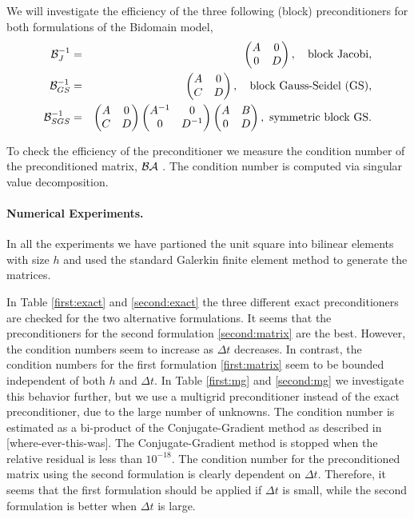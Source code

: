 \documentclass{report}
\begin{document}
We will investigate the efficiency of the three following (block) preconditioners for
both formulations of the Bidomain model,
\begin{eqnarray*}
\mathcal{B}_J^{-1} &=&
\begin{pmatrix}
A & 0\\
0 & D
\end{pmatrix}, \quad \mbox{block Jacobi}, \\
\mathcal{B}_{GS}^{-1} &=&
\begin{pmatrix}
A & 0\\
C & D
\end{pmatrix}, \quad \mbox{block Gauss-Seidel (GS)}, \\
\mathcal{B}_{SGS}^{-1} &=&
\begin{pmatrix}
A & 0\\
C & D
\end{pmatrix}
\begin{pmatrix}
A^{-1} & 0\\
0 & D^{-1}
\end{pmatrix}
\begin{pmatrix}
A & B\\
0 & D
\end{pmatrix}, \ \mbox{symmetric block GS}.
\end{eqnarray*}

To check the efficiency of the preconditioner we measure the condition
number of the preconditioned matrix, $\mathcal{B} \mathcal{A}$ .
The condition number is computed via singular value decomposition.


\paragraph{Numerical Experiments.}
In all the experiments we have partioned the unit square into
bilinear elements with size $h$ and used the standard
Galerkin finite element method to generate the matrices.

In Table \ref{first:exact} and \ref{second:exact} the three different
exact preconditioners are checked for the two alternative formulations.
It seems that the preconditioners for the second formulation \eqref{second:matrix}
are the best.
However, the condition numbers seem to increase as $\Delta t$ decreases. In contrast,
the condition numbers for the first formulation \eqref{first:matrix} seem
to be bounded independent of both $h$ and $\Delta t$.
In Table \ref{first:mg} and \ref{second:mg} we investigate this behavior further,
but we use a multigrid preconditioner instead of the exact preconditioner,
due to the large number of
unknowns. The condition number is estimated as a bi-product of the
Conjugate-Gradient method as described in [where-ever-this-was].
The Conjugate-Gradient method is stopped when the relative residual
is less than $10^{-18}$.
The condition number for the preconditioned matrix using the second formulation
is clearly dependent on $\Delta t$. Therefore, it seems that the first formulation
should be applied if $\Delta t$ is small, while the second formulation is
better when $\Delta t$
is large.
\end{document}
